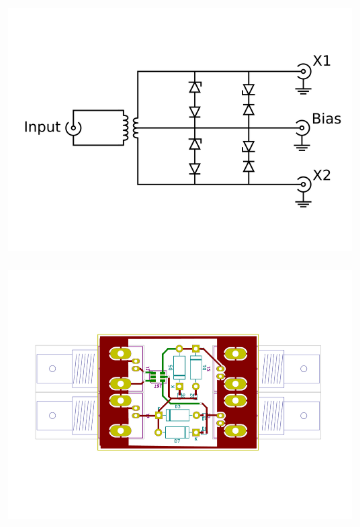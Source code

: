 \begin{figure}
\centering
\begin{subfigure}{.5\textwidth}
	\centering
	\includegraphics[height=0.2\textheight]{Chapters/Deflection/circuit_CTT}
	\caption{}
	\label{fig:circuit_ctt}
\end{subfigure}%
\begin{subfigure}{.5\textwidth}
	\centering
	\includegraphics[height=0.2\textheight]{Chapters/Deflection/PCB_CTT}
	\caption{}
	\label{fig:PCB_CTT}
\end{subfigure}
\caption{}
\label{fig:CTT}
\end{figure}



